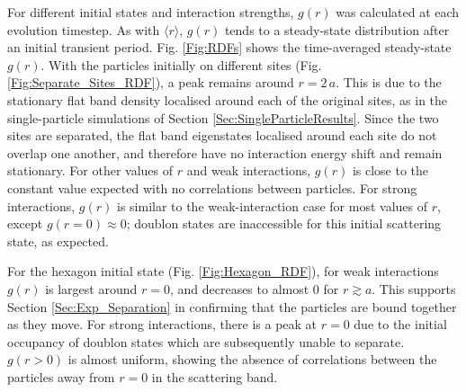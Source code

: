 For different initial states and interaction strengths, $g(r)$ was calculated at each evolution timestep. As with $\langle r \rangle$, $g(r)$ tends to a steady-state distribution after an initial transient period. Fig. \ref{Fig:RDFs} shows the time-averaged steady-state $g(r)$. With the particles initially on different sites (Fig. \ref{Fig:Separate_Sites_RDF}), a peak remains around $r=2\,a$. This is due to the stationary flat band density localised around each of the original sites, as in the single-particle simulations of Section \ref{Sec:SingleParticleResults}. Since the two sites are separated, the flat band eigenstates localised around each site do not overlap one another, and therefore have no interaction energy shift and remain stationary. For other values of $r$ and weak interactions, $g(r)$ is close to the constant value expected with no correlations between particles. For strong interactions, $g(r)$ is similar to the weak-interaction case for most values of $r$, except $g(r=0)\approx 0$; doublon states are inaccessible for this initial scattering state, as expected.

For the hexagon initial state (Fig. \ref{Fig:Hexagon_RDF}), for weak interactions $g(r)$ is largest around $r=0$, and decreases to almost 0 for $r\gtrsim a$. This supports Section \ref{Sec:Exp_Separation} in confirming that the particles are bound together as they move. For strong interactions, there is a peak at $r=0$ due to the initial occupancy of doublon states which are subsequently unable to separate. $g(r>0)$ is almost uniform, showing the absence of correlations between the particles away from $r=0$ in the scattering band. 

